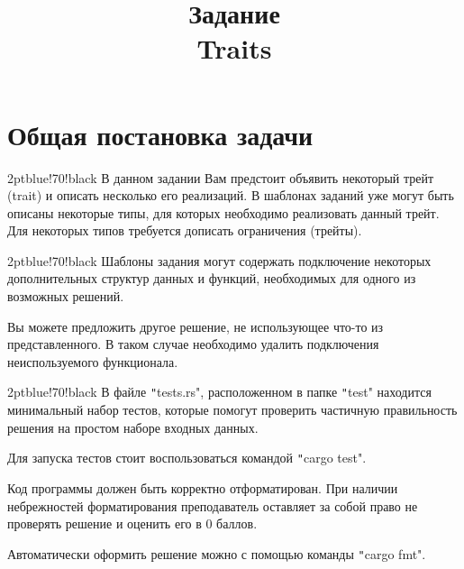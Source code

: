 \documentclass[a4paper, 10pt]{extarticle}
\begin{document}
\title{Задание \\ Traits }
\author{}
\date{}
\maketitle

\section{Общая постановка задачи}

\begin{awesomeblock}{2pt}{\faTasks}{blue!70!black}
    В данном задании Вам предстоит объявить некоторый трейт (trait) и описать несколько его реализаций. В шаблонах заданий уже могут быть описаны некоторые типы, для которых необходимо реализовать данный трейт. Для некоторых типов требуется дописать ограничения (трейты).
\end{awesomeblock}

\begin{awesomeblock}{2pt}{\faTasks}{blue!70!black}
    Шаблоны задания могут содержать подключение некоторых дополнительных структур данных и функций, необходимых для одного из возможных решений. 
    
    Вы можете предложить другое решение, не использующее что-то из представленного. В таком случае необходимо удалить подключения неиспользуемого функционала.
\end{awesomeblock}

\begin{awesomeblock}{2pt}{\faTasks}{blue!70!black}
    В файле \texttt"tests.rs", расположенном в папке \texttt"test" находится минимальный набор тестов, которые помогут проверить частичную правильность решения на простом наборе входных данных.

    Для запуска тестов стоит воспользоваться командой \texttt"cargo test".
\end{awesomeblock}

\begin{importantblock}
    Код программы должен быть корректно отформатирован. При наличии небрежностей форматирования преподаватель оставляет за собой право  не проверять решение и оценить его в 0 баллов. 

    Автоматически оформить решение можно с помощью команды \texttt"cargo fmt".
\end{importantblock}
\end{document}
